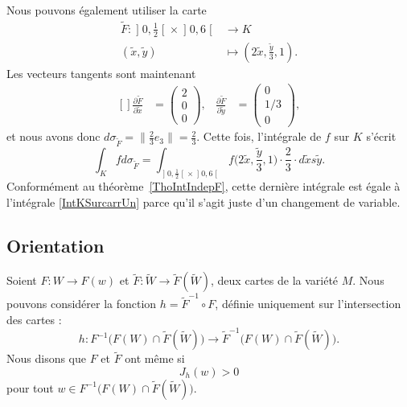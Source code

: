 Nous pouvons également utiliser la carte
\begin{equation}
	\begin{aligned}
		\tilde F\colon \mathopen] 0 , \frac{ 1 }{2} \mathclose[\times\mathopen] 0 , 6 \mathclose[&\to K \\
		(\tilde x,\tilde y)&\mapsto (2\tilde x,\frac{ \tilde y }{ 3 },1).
	\end{aligned}
\end{equation}
Les vecteurs tangents sont maintenant
\begin{equation}
	\begin{aligned}[]
		\frac{ \partial \tilde F }{ \partial \tilde x }&=\begin{pmatrix}
			2	\\
			0	\\
			0
		\end{pmatrix},
		&\frac{ \partial \tilde F }{ \partial \tilde y }&=\begin{pmatrix}
			0	\\
			1/3	\\
			0
		\end{pmatrix},
	\end{aligned}
\end{equation}
et nous avons donc $d\sigma_{\tilde F}=\| \frac{ 2 }{ 3 }e_3 \|=\frac{ 2 }{ 3 }$. Cette fois, l'intégrale de $f$ sur $K$ s'écrit
\begin{equation}
	\int_Kfd\sigma_{\tilde F}=\int_{\mathopen] 0 , \frac{ 1 }{2} \mathclose[\times\mathopen] 0 , 6 \mathclose[}f\big( 2\tilde x,\frac{ \tilde y }{ 3 },1 \big)\cdot\frac{ 2 }{ 3 }\cdot d\tilde xs\tilde y.
\end{equation}
Conformément au théorème~\ref{ThoIntIndepF}, cette dernière intégrale est égale à l'intégrale \eqref{IntKSurcarrUn} parce qu'il s'agit juste d'un changement de variable.

\subsection{Orientation}

Soient $F\colon W\to F(w)$ et $\tilde F\colon \tilde W\to \tilde F(\tilde W)$, deux cartes de la variété $M$. Nous pouvons considérer la fonction $h=\tilde F^{-1}\circ F$, définie uniquement sur l'intersection des cartes :
\begin{equation}
	h\colon F^{-1}\big( F(W)\cap\tilde F(\tilde W) \big)\to \tilde F^{-1}\big( F(W)\cap\tilde F(\tilde W) \big).
\end{equation}
Nous disons que $F$ et $\tilde F$ ont même  si
\begin{equation}
	J_h(w)>0
\end{equation}
pour tout $w\in  F^{-1}\big( F(W)\cap\tilde F(\tilde W) \big)$.

